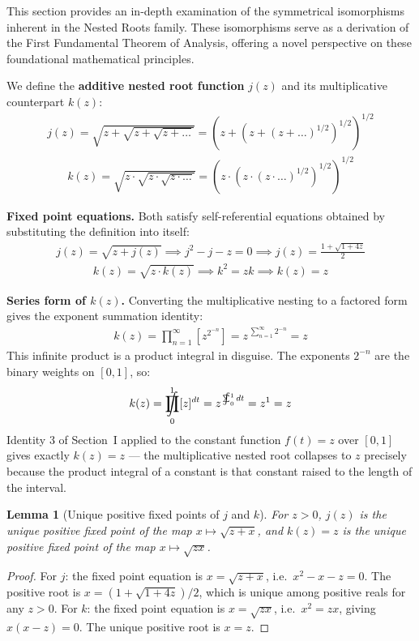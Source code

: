 \documentclass{article}
\newtheorem{lemma}{Lemma}
\DeclareMathOperator*{\SumInt}{%
\mathchoice%
  {\ooalign{$\displaystyle\sum$\cr\hidewidth$\displaystyle\int$\hidewidth\cr}}
  {\ooalign{\raisebox{.14\height}{\scalebox{.7}{$\textstyle\sum$}}\cr\hidewidth$\textstyle\int$\hidewidth\cr}}
  {\ooalign{\raisebox{.2\height}{\scalebox{.6}{$\scriptstyle\sum$}}\cr$\scriptstyle\int$\cr}}
  {\ooalign{\raisebox{.2\height}{\scalebox{.6}{$\scriptstyle\sum$}}\cr$\scriptstyle\int$\cr}}
}
\DeclareMathOperator*{\ProdInt}{%
\mathchoice%
  {\ooalign{$\displaystyle\prod$\cr\hidewidth$\displaystyle\int$\hidewidth\cr}}
  {\ooalign{\raisebox{.14\height}{\scalebox{.7}{$\textstyle\prod$}}\cr\hidewidth$\textstyle\int$\hidewidth\cr}}
  {\ooalign{\raisebox{.2\height}{\scalebox{.6}{$\scriptstyle\prod$}}\cr$\scriptstyle\int$\cr}}
  {\ooalign{\raisebox{.2\height}{\scalebox{.6}{$\scriptstyle\prod$}}\cr$\scriptstyle\int$\cr}}
}
\begin{document}
This section provides an in-depth examination of the symmetrical isomorphisms inherent in the Nested Roots family. These isomorphisms serve as a derivation of the First Fundamental Theorem of Analysis, offering a novel perspective on these foundational mathematical principles.

We define the \textbf{additive nested root function} $j(z)$ and its multiplicative counterpart $k(z)$:
\begin{align*}
j(z) = \sqrt{z + \sqrt{z + \sqrt{z + \ldots}}} = \left(z + \left(z + \left(z + \ldots\right)^{1/2}\right)^{1/2}\right)^{1/2}
\end{align*}
\begin{align*}
k(z) = \sqrt{z \cdot \sqrt{z \cdot \sqrt{z \cdot \ldots}}} = \left(z \cdot \left(z \cdot \left(z \cdot \ldots\right)^{1/2}\right)^{1/2}\right)^{1/2}
\end{align*}

\textbf{Fixed point equations.} Both satisfy self-referential equations obtained by substituting the definition into itself:
\begin{align*}
j(z) = \sqrt{z + j(z)} \implies j^2 - j - z = 0 \implies j(z) = \frac{1 + \sqrt{1 + 4z}}{2}
\end{align*}
\begin{align*}
k(z) = \sqrt{z \cdot k(z)} \implies k^2 = zk \implies k(z) = z
\end{align*}

\textbf{Series form of $k(z)$.} Converting the multiplicative nesting to a factored form gives the exponent summation identity:
\begin{align*}
k(z) = \prod_{n=1}^{\infty} \left[z^{2^{-n}}\right] = z^{\,\sum_{n=1}^{\infty} 2^{-n}} = z
\end{align*}
This infinite product is a product integral in disguise. The exponents $2^{-n}$ are the binary weights on $[0,1]$, so:
\begin{align*}
k(z) = \ProdInt_0^1 [z]^{dt} = z^{\,\SumInt_0^1 dt} = z^1 = z
\end{align*}
Identity 3 of Section~I applied to the constant function $f(t) = z$ over $[0,1]$ gives exactly $k(z) = z$ — the multiplicative nested root collapses to $z$ precisely because the product integral of a constant is that constant raised to the length of the interval.

\begin{lemma}[Unique positive fixed points of $j$ and $k$]
For $z > 0$, $j(z)$ is the unique positive fixed point of the map $x \mapsto \sqrt{z + x}$, and $k(z) = z$ is the unique positive fixed point of the map $x \mapsto \sqrt{zx}$.
\end{lemma}
\begin{proof}
For $j$: the fixed point equation is $x = \sqrt{z+x}$, i.e.\ $x^2 - x - z = 0$. The positive root is $x = (1+\sqrt{1+4z})/2$, which is unique among positive reals for any $z > 0$. For $k$: the fixed point equation is $x = \sqrt{zx}$, i.e.\ $x^2 = zx$, giving $x(x-z) = 0$. The unique positive root is $x = z$.
\end{proof}
\end{document}
